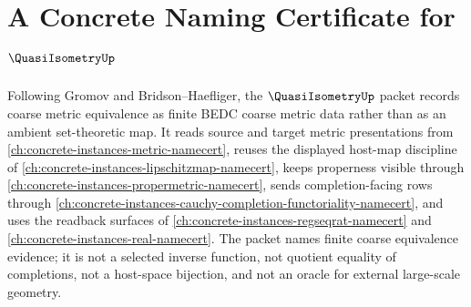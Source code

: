 \chapter{A Concrete Naming Certificate for $\QuasiIsometryUp$}
\label{ch:concrete-instances-quasi-isometry-namecert}

Following Gromov and Bridson--Haefliger, the $\QuasiIsometryUp$ packet records coarse metric equivalence as finite BEDC coarse metric data rather than as an ambient set-theoretic map. It reads source and target metric presentations from \autoref{ch:concrete-instances-metric-namecert}, reuses the displayed host-map discipline of \autoref{ch:concrete-instances-lipschitzmap-namecert}, keeps properness visible through \autoref{ch:concrete-instances-propermetric-namecert}, sends completion-facing rows through \autoref{ch:concrete-instances-cauchy-completion-functoriality-namecert}, and uses the readback surfaces of \autoref{ch:concrete-instances-regseqrat-namecert} and \autoref{ch:concrete-instances-real-namecert}. The packet names finite coarse equivalence evidence; it is not a selected inverse function, not quotient equality of completions, not a host-space bijection, and not an oracle for external large-scale geometry.

